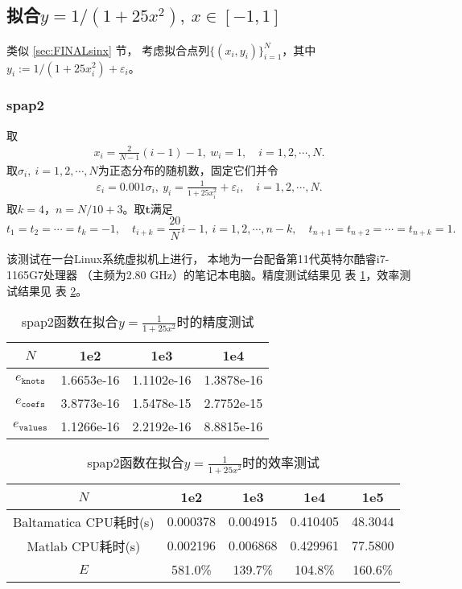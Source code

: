 \subsection{拟合$y=1/(1+25x^{2}),\ x\in[-1,1]$}
\label{sec:FINALRunge}

类似 \ref{sec:FINALsinx} 节，
考虑拟合点列$\{(x_{i},y_{i})\}_{i=1}^{N}$，其中
$y_{i}:=1/(1+25x_{i}^{2})+\varepsilon_{i}$。

\subsubsection{spap2}
\label{subsubsec:spap2Runge}
取
\begin{align*}
  x_{i}=\frac{2}{N-1} (i-1)-1,\
  w_{i}=1, \quad i=1,2,\cdots,N.
\end{align*}
取$\sigma_{i},\ i=1,2,\cdots,N$为正态分布的随机数，固定它们并令
\begin{align*}
  \varepsilon_{i}=0.001\sigma_{i},\
  y_{i}=\frac{1}{1+25x_{i}^{2}}+\varepsilon_{i},\quad i=1,2,\cdots,N.
\end{align*}
取$k=4$，$n=N/10+3$。取$\mathbf{t}$满足
\begin{equation*}
  t_{1}=t_{2}=\cdots=t_{k}=-1,
  \quad
  t_{i+k}=\frac{20}{N} i-1,\ i=1,2,\cdots,n-k,
  \quad
  t_{n+1}=t_{n+2}=\cdots=t_{n+k}=1.
\end{equation*}

该测试在一台Linux系统虚拟机上进行，
本地为一台配备第11代英特尔酷睿i7-1165G7处理器
（主频为2.80 GHz）的笔记本电脑。精度测试结果见
表 \ref{tab:FINALspap2Rungeacc}，效率测试结果见
表 \ref{tab:FINALspap2Rungetime}。

\begin{table}[htbp]
  \centering
  \caption{\label{tab:FINALspap2Rungeacc}spap2函数在拟合$y=\frac{1}{1+25x^{2}}$时的精度测试}
  \begin{tabular}{cccc}
    \hline
    $N$& 1e2 & 1e3 & 1e4\\
    \hline
    $e_{\texttt{knots}}$&1.6653e-16& 1.1102e-16& 1.3878e-16\\
    $e_{\texttt{coefs}}$&3.8773e-16& 1.5478e-15&2.7752e-15\\
    $e_{\texttt{values}}$&1.1266e-16&2.2192e-16& 8.8815e-16\\
    \hline
  \end{tabular}
\end{table}

\begin{table}[htbp]
  \centering
  \caption{\label{tab:FINALspap2Rungetime}spap2函数在拟合$y=\frac{1}{1+25x^{2}}$时的效率测试}
  \begin{tabular}{ccccc}
    \hline
    $N$&1e2&1e3&1e4&1e5\\
    \hline
    Baltamatica CPU耗时(s)&0.000378&0.004915&0.410405&48.3044\\
    Matlab CPU耗时(s)&0.002196&0.006868&0.429961&77.5800\\
    $E$&581.0\%&139.7\%&104.8\%&160.6\%\\
    \hline
  \end{tabular}
\end{table}


